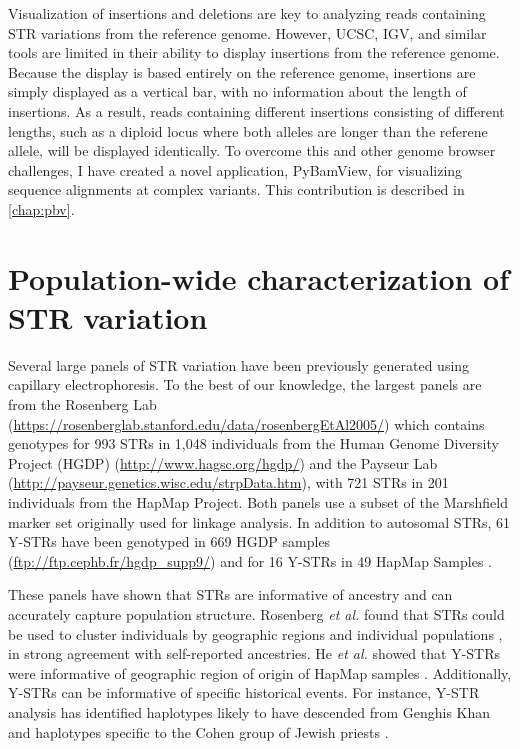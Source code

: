 Visualization of insertions and deletions are key to analyzing reads containing STR variations from the reference genome. However, UCSC, IGV, and similar tools are limited in their ability to display insertions from the reference genome. Because the display is based entirely on the reference genome, insertions are simply displayed as a vertical bar, with no information about the length of insertions. As a result, reads containing different insertions consisting of different lengths, such as a diploid locus where both alleles are longer than the referene allele, will be displayed identically. To overcome this and other genome browser challenges, I have created a novel application, PyBamView, for visualizing sequence alignments at complex variants. This contribution is described in \autoref{chap:pbv}.

\section{Population-wide characterization of STR variation}
Several large panels of STR variation have been previously generated using capillary electrophoresis. To the best of our knowledge, the largest panels are from the Rosenberg Lab (\url{https://rosenberglab.stanford.edu/data/rosenbergEtAl2005/}) which contains genotypes for 993 STRs in 1,048 individuals from the Human Genome Diversity Project (HGDP) (\url{http://www.hagsc.org/hgdp/}) and the Payseur Lab (\url{http://payseur.genetics.wisc.edu/strpData.htm}), with 721 STRs in 201 individuals from the HapMap Project. Both panels use a subset of the Marshfield marker set originally used for linkage analysis. In addition to autosomal STRs, 61 Y-STRs have been genotyped in 669 HGDP samples (\url{ftp://ftp.cephb.fr/hgdp_supp9/}) and for 16 Y-STRs in 49 HapMap Samples \cite{HeGitschierZerjalEtAl2009}.

These panels have shown that STRs are informative of ancestry and can accurately capture population structure. Rosenberg \emph{et al.} found that STRs could be used to cluster individuals by geographic regions and individual populations \cite{RosenbergPritchardWeberEtAl2002}, in strong agreement with self-reported ancestries. He \emph{et al.} showed that Y-STRs were informative of geographic region of origin of HapMap samples \cite{HeGitschierZerjalEtAl2009}. Additionally, Y-STRs can be informative of specific historical events. For instance, Y-STR analysis has identified haplotypes likely to have descended from Genghis Khan \cite{ZerjalXueBertorelleEtAl2003} and haplotypes specific to the Cohen group of Jewish priests \cite{SkoreckiSeligBlazerEtAl1997}.

